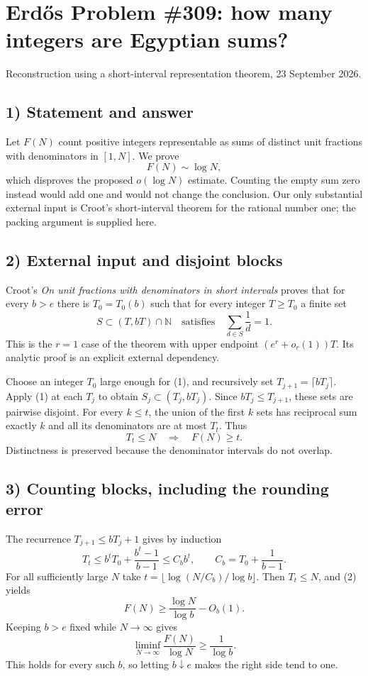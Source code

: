 \section{Erd\H{o}s Problem \#309: how many integers are Egyptian sums?}
\noindent Reconstruction using a short-interval representation theorem, 23 September 2026.

\subsection*{1) Statement and answer}
Let $F(N)$ count positive integers representable as sums of distinct unit fractions with denominators in $[1,N]$. We prove
\[
 F(N)\sim\log N,
\]
which disproves the proposed $o(\log N)$ estimate. Counting the empty sum zero instead would add one and would not change the conclusion. Our only substantial external input is Croot's short-interval theorem for the rational number one; the packing argument is supplied here.

\subsection*{2) External input and disjoint blocks}
Croot's \emph{On unit fractions with denominators in short intervals} proves that for every $b>e$ there is $T_0=T_0(b)$ such that for every integer $T\ge T_0$ a finite set
\[
 S\subset (T,bT)\cap\mathbb N
 \quad\text{satisfies}\quad \sum_{d\in S}\frac1d=1.\tag{1}
\]
This is the $r=1$ case of the theorem with upper endpoint $(e^r+o_r(1))T$. Its analytic proof is an explicit external dependency.

Choose an integer $T_0$ large enough for (1), and recursively set $T_{j+1}=\lceil bT_j\rceil$. Apply (1) at each $T_j$ to obtain $S_j\subset(T_j,bT_j)$. Since $bT_j\le T_{j+1}$, these sets are pairwise disjoint. For every $k\le t$, the union of the first $k$ sets has reciprocal sum exactly $k$ and all its denominators are at most $T_t$. Thus
\[
 T_t\le N\quad\Longrightarrow\quad F(N)\ge t.\tag{2}
\]
Distinctness is preserved because the denominator intervals do not overlap.

\subsection*{3) Counting blocks, including the rounding error}
The recurrence $T_{j+1}\le bT_j+1$ gives by induction
\[
 T_t\le b^tT_0+\frac{b^t-1}{b-1}
 \le C_b b^t,\qquad C_b=T_0+\frac1{b-1}.
\]
For all sufficiently large $N$ take $t=\lfloor\log(N/C_b)/\log b\rfloor$. Then $T_t\le N$, and (2) yields
\[
 F(N)\ge\frac{\log N}{\log b}-O_b(1).
\]
Keeping $b>e$ fixed while $N\to\infty$ gives
\[
 \liminf_{N\to\infty}\frac{F(N)}{\log N}\ge\frac1{\log b}.
\]
This holds for every such $b$, so letting $b\downarrow e$ makes the right side tend to one.

